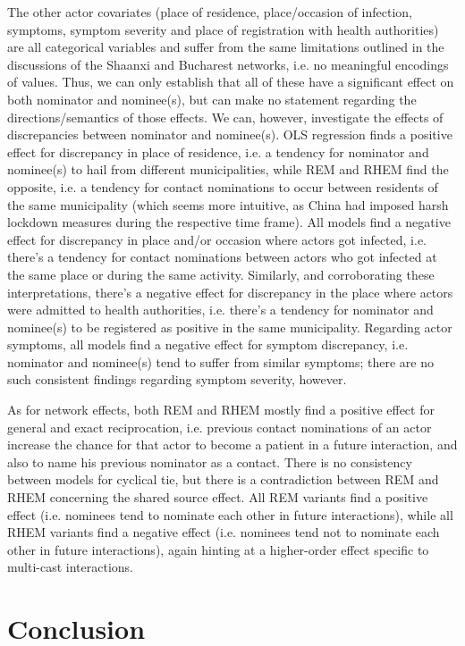 The other actor covariates (place of residence, place/occasion of infection, symptoms, symptom severity and place of registration with health authorities) are all categorical variables and suffer from the same limitations outlined in the discussions of the Shaanxi and Bucharest networks, i.e. no meaningful encodings of values. Thus, we can only establish that all of these have a significant effect on both nominator and nominee(s), but can make no statement regarding the directions/semantics of those effects. We can, however, investigate the effects of discrepancies between nominator and nominee(s). OLS regression finds a positive effect for discrepancy in place of residence, i.e. a tendency for nominator and nominee(s) to hail from different municipalities, while REM and RHEM find the opposite, i.e. a tendency for contact nominations to occur between residents of the same municipality (which seems more intuitive, as China had imposed harsh lockdown measures during the respective time frame). All models find a negative effect for discrepancy in place and/or occasion where actors got infected, i.e. there's a tendency for contact nominations between actors who got infected at the same place or during the same activity. Similarly, and corroborating these interpretations, there's a negative effect for discrepancy in the place where actors were admitted to health authorities, i.e. there's a tendency for nominator and nominee(s) to be registered as positive in the same municipality. Regarding actor symptoms, all models find a negative effect for symptom discrepancy, i.e. nominator and nominee(s) tend to suffer from similar symptoms; there are no such consistent findings regarding symptom severity, however.

As for network effects, both REM and RHEM mostly find a positive effect for general and exact reciprocation, i.e. previous contact nominations of an actor increase the chance for that actor to become a patient in a future interaction, and also to name his previous nominator as a contact. There is no consistency between models for cyclical tie, but there is a contradiction between REM and RHEM concerning the shared source effect. All REM variants find a positive effect (i.e. nominees tend to nominate each other in future interactions), while all RHEM variants find a negative effect (i.e. nominees tend not to nominate each other in future interactions), again hinting at a higher-order effect specific to multi-cast interactions.

\section{Conclusion}